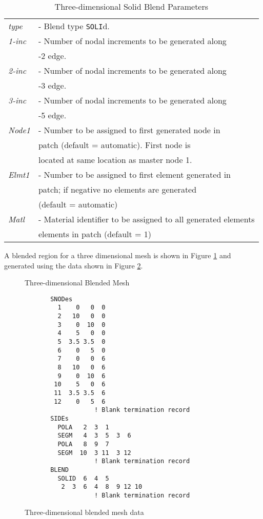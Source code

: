 \begin{table}[ht!]
\begin{center}
\begin{tabular}{l l}
\it type  &- Blend type {\tt SOLI}d. \\
\it 1-inc &- Number of nodal increments to be generated along \\
          &\quad 1-2 edge. \\
\it 2-inc & - Number of nodal increments to be generated along \\
          &\quad 2-3 edge. \\
\it 3-inc &- Number of nodal increments to be generated along \\
          &\quad 1-5 edge. \\
\it Node1 &- Number to be assigned to first generated node in \\
          &\quad patch (default = automatic).  First node is \\
          &\quad located at same location as master node 1. \\
\it Elmt1 &- Number to be assigned to first element generated in \\
          &\quad patch; if negative no elements are generated \\
          &\quad (default = automatic) \\
\it Matl  &- Material identifier to be assigned to all generated elements \\
          &\quad elements in patch (default = 1) \\
\end{tabular}
\end{center}
\caption{Three-dimensional Solid Blend Parameters}
\label{tabb2}
\end{table}

A blended region for a three dimensional mesh is shown in Figure \ref{figb3}
and generated using the data shown in Figure \ref{figb4}.

\begin{figure}[ht!]
\epsfxsize=2.5in
\centerline {\hfil {} \hspace{0.5in} \epsfxsize=2.5in
 \hfil}
\caption{Three-dimensional Blended Mesh}
\label{figb3}
\end{figure}

\begin{figure}[ht!]
\begin{verbatim}
       SNODes
         1    0   0  0
         2   10   0  0
         3    0  10  0
         4    5   0  0
         5  3.5 3.5  0
         6    0   5  0
         7    0   0  6
         8   10   0  6
         9    0  10  6
        10    5   0  6
        11  3.5 3.5  6
        12    0   5  6
                   ! Blank termination record
       SIDEs
         POLA   2  3  1
         SEGM   4  3  5  3  6
         POLA   8  9  7
         SEGM  10  3 11  3 12
                   ! Blank termination record
       BLEND
         SOLID  6  4  5
          2  3  6  4  8  9 12 10
                   ! Blank termination record
\end{verbatim}
\caption{Three-dimensional blended mesh data}
\label{figb4}
\end{figure}

